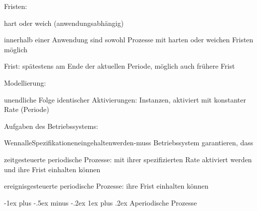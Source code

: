 \documentclass[a4paper]{article}
\makeatletter
\renewcommand{\subsubsection}{\@startsection{subsubsection}{3}{0mm}%
 {-1ex plus -.5ex minus -.2ex}%
 {1ex plus .2ex}%
 {\normalfont\small\bfseries}}
\makeatother
\begin{document}
\begin{multicols}{3}
    \begin{itemize*}
        \item
        Fristen:
        \begin{itemize*}
            \item hart oder weich (anwendungsabhängig) \begin{itemize*} \item   innerhalb einer Anwendung sind sowohl Prozesse mit harten oder   weichen Fristen möglich \item   Frist: spätestens am Ende der aktuellen Periode, möglich auch   frühere Frist \end{itemize*}
        \end{itemize*}
        \item
        Modellierung:
        \begin{itemize*}
            \item unendliche Folge identischer Aktivierungen: Instanzen, aktiviert mit konstanter Rate (Periode)
        \end{itemize*}
        \item
        Aufgaben des Betriebssystems:
        \begin{itemize*}
            \item WennalleSpezifikationeneingehaltenwerden-muss Betriebssystem garantieren, dass \begin{enumerate*}  \item   zeitgesteuerte periodische Prozesse: mit ihrer spezifizierten Rate   aktiviert werden und ihre Frist einhalten können \item   ereignisgesteuerte periodische Prozesse: ihre Frist einhalten   können \end{enumerate*}
        \end{itemize*}
    \end{itemize*}


    \subsubsection{Aperiodische Prozesse}


\end{multicols}
\end{document}
